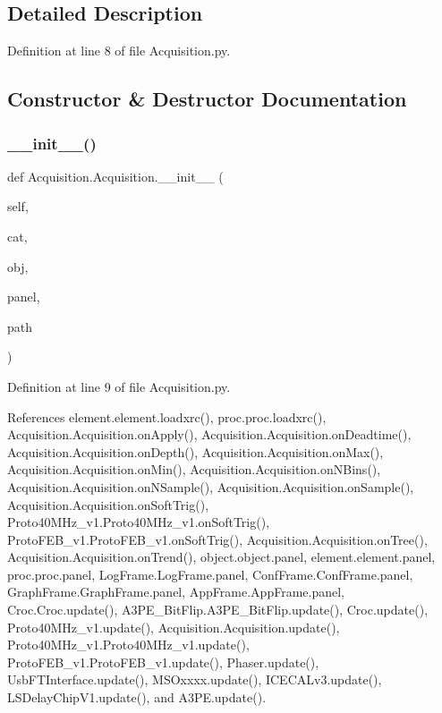 \subsection{Detailed Description}


Definition at line 8 of file Acquisition.\+py.



\subsection{Constructor \& Destructor Documentation}
\mbox{\label{classAcquisition_1_1Acquisition_a2811edf47d59be70aeb9589a5e339893}} 
\subsubsection{\texorpdfstring{\+\_\+\+\_\+init\+\_\+\+\_\+()}{\_\_init\_\_()}}
{\footnotesize\ttfamily def Acquisition.\+Acquisition.\+\_\+\+\_\+init\+\_\+\+\_\+ (\begin{DoxyParamCaption}\item[{}]{self,  }\item[{}]{cat,  }\item[{}]{obj,  }\item[{}]{panel,  }\item[{}]{path }\end{DoxyParamCaption})}



Definition at line 9 of file Acquisition.\+py.



References element.\+element.\+loadxrc(), proc.\+proc.\+loadxrc(), Acquisition.\+Acquisition.\+on\+Apply(), Acquisition.\+Acquisition.\+on\+Deadtime(), Acquisition.\+Acquisition.\+on\+Depth(), Acquisition.\+Acquisition.\+on\+Max(), Acquisition.\+Acquisition.\+on\+Min(), Acquisition.\+Acquisition.\+on\+N\+Bins(), Acquisition.\+Acquisition.\+on\+N\+Sample(), Acquisition.\+Acquisition.\+on\+Sample(), Acquisition.\+Acquisition.\+on\+Soft\+Trig(), Proto40\+M\+Hz\+\_\+v1.\+Proto40\+M\+Hz\+\_\+v1.\+on\+Soft\+Trig(), Proto\+F\+E\+B\+\_\+v1.\+Proto\+F\+E\+B\+\_\+v1.\+on\+Soft\+Trig(), Acquisition.\+Acquisition.\+on\+Tree(), Acquisition.\+Acquisition.\+on\+Trend(), object.\+object.\+panel, element.\+element.\+panel, proc.\+proc.\+panel, Log\+Frame.\+Log\+Frame.\+panel, Conf\+Frame.\+Conf\+Frame.\+panel, Graph\+Frame.\+Graph\+Frame.\+panel, App\+Frame.\+App\+Frame.\+panel, Croc.\+Croc.\+update(), A3\+P\+E\+\_\+\+Bit\+Flip.\+A3\+P\+E\+\_\+\+Bit\+Flip.\+update(), Croc.\+update(), Proto40\+M\+Hz\+\_\+v1.\+update(), Acquisition.\+Acquisition.\+update(), Proto40\+M\+Hz\+\_\+v1.\+Proto40\+M\+Hz\+\_\+v1.\+update(), Proto\+F\+E\+B\+\_\+v1.\+Proto\+F\+E\+B\+\_\+v1.\+update(), Phaser.\+update(), Usb\+F\+T\+Interface.\+update(), M\+S\+Oxxxx.\+update(), I\+C\+E\+C\+A\+Lv3.\+update(), L\+S\+Delay\+Chip\+V1.\+update(), and A3\+P\+E.\+update().


